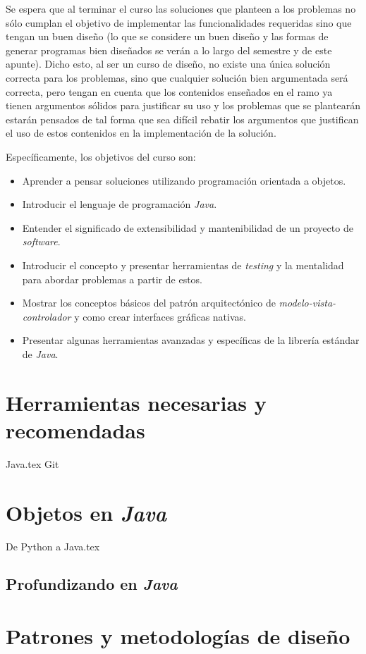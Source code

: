 \documentclass[12pt]{book}
\theoremstyle{definition}
\begin{document}
      Se espera que al terminar el curso las soluciones que planteen a los problemas no
      sólo cumplan el objetivo de implementar las funcionalidades requeridas sino que 
      tengan un buen diseño (lo que se considere un buen diseño y las formas de generar 
      programas bien diseñados se verán a lo largo del semestre y de este apunte).
      Dicho esto, al ser un curso de diseño, no existe una única solución correcta para 
      los problemas, sino que cualquier solución bien argumentada será correcta, pero 
      tengan en cuenta que los contenidos enseñados en el ramo ya tienen argumentos 
      sólidos para justificar su uso y los problemas que se plantearán estarán pensados de
      tal forma que sea difícil rebatir los argumentos que justifican el uso de estos 
      contenidos en la implementación de la solución.

      Específicamente, los objetivos del curso son:

      \begin{itemize}
        \item Aprender a pensar soluciones utilizando programación orientada a objetos.
        \item Introducir el lenguaje de programación \textit{Java}.
        \item Entender el significado de extensibilidad y mantenibilidad de un proyecto de 
          \textit{software}.
        \item Introducir el concepto y presentar herramientas de \textit{testing} y la 
          mentalidad para abordar problemas a partir de estos.
        \item Mostrar los conceptos básicos del patrón arquitectónico de 
          \textit{modelo-vista-controlador} y como crear interfaces gráficas nativas.
        \item Presentar algunas herramientas avanzadas y específicas de la librería 
            estándar de \textit{Java}.
      \end{itemize}

  \mainmatter
  \part{Herramientas necesarias y recomendadas}
    {Java.tex}
    {Git}
  \part{Objetos en \textit{Java}}
    
    {De Python a Java.tex}
    \chapter{Profundizando en \textit{Java}}
      \label{ch:java}
  \part{Patrones y metodologías de diseño}
\end{document}
